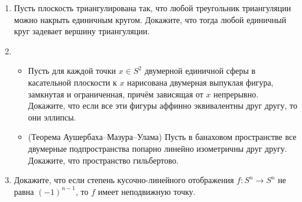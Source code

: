\documentclass[12pt]{article}
\begin{document}
\begin{enumerate}
%
%
%
%
%
%
%
%

  \item Пусть плоскость триангулирована так, что любой треугольник триангуляции можно накрыть единичным кругом. Докажите, что тогда любой единичный круг задевает вершину триангуляции.

  \item \begin{itemize}
          \item Пусть для каждой точки $x \in S^2$ двумерной единичной сферы в касательной плоскости к $x$ нарисована двумерная выпуклая фигура, замкнутая и ограниченная, причём зависящая от $x$ непрерывно. Докажите, что если все эти фигуры аффинно эквивалентны друг другу, то они эллипсы.
          \item (Теорема Аушербаха--Мазура--Улама) Пусть в банаховом пространстве все двумерные подпространства попарно линейно изометричны друг другу. Докажите, что пространство гильбертово.
        \end{itemize}

  \item Докажите, что если степень кусочно-линейного отображения $f: S^n \to S^n$ не равна $(-1)^{n-1}$, то $f$ имеет неподвижную точку.

\end{enumerate}
\end{document}
